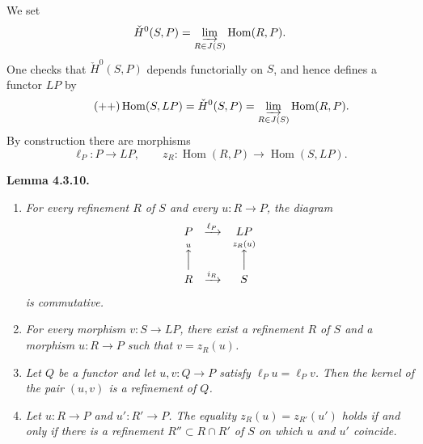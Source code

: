 %
We set
\[
 \check H^0(S,P)=
 \varinjlim_{R\in J(S)}\operatorname{Hom}(R,P).
\]
One checks that \(\check H^0(S,P)\) depends functorially on \(S\), and hence
defines a functor \(LP\) by
\[
\tag{++}\label{sga3:iv:definition:4:3:10:0:eq:unnamed:01}
 \operatorname{Hom}(S,LP)=\check H^0(S,P)
 =\varinjlim_{R\in J(S)}\operatorname{Hom}(R,P).
\]
By construction there are morphisms
\[
 \ell_P:P\longrightarrow LP,
 \qquad
 z_R:\operatorname{Hom}(R,P)\longrightarrow\operatorname{Hom}(S,LP).
\]

\medskip
\noindent{}\textbf{Lemma 4.3.10.}
\begin{enumerate}
 \item[(i)] \textit{For every refinement \(R\) of \(S\) and every
 \(u:R\to P\), the diagram}
 \[
 \begin{array}{ccc}
 P&\xrightarrow{\ell_P}&LP\\
 \overset{u}{\Big\uparrow}&&
 \overset{z_R(u)}{\Big\uparrow}\\
 R&\xrightarrow{i_R}&S
 \end{array}
 \]
 \textit{is commutative.}
 \item[(ii)] \textit{For every morphism \(v:S\to LP\), there exist a
 refinement \(R\) of \(S\) and a morphism \(u:R\to P\) such that
 \(v=z_R(u)\).}
 \item[(iii)] \textit{Let \(Q\) be a functor and let \(u,v:Q\to P\)
 satisfy \(\ell_Pu=\ell_Pv\). Then the kernel of the pair \((u,v)\) is a
 refinement of \(Q\).}
 \item[(iv)] \textit{Let \(u:R\to P\) and \(u':R'\to P\). The equality
 \(z_R(u)=z_{R'}(u')\) holds if and only if there is a refinement
 \(R''\subset R\cap R'\) of \(S\) on which \(u\) and \(u'\) coincide.}
\end{enumerate}

